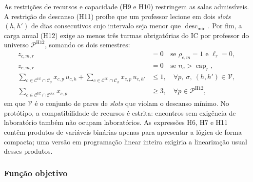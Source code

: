 As restrições de recursos e capacidade (H9 e H10) restringem as salas admissíveis. A restrição de descanso (H11) proíbe que um professor lecione em dois \textit{slots} $(h,h')$ de dias consecutivos cujo intervalo seja menor que $\operatorname{desc}_{\min}$. Por fim, a carga anual (H12) exige ao menos três turmas obrigatórias do IC por professor do universo $\mathcal{P}^{\mathrm{H12}}$, somando os dois semestres:
\begin{align}
  z_{c,m,r} &= 0 \quad \text{se } \rho_{c,m}=1 \text{ e } \ell_r=0, \tag{H9}\\
  z_{c,m,r} &= 0 \quad \text{se } n_c>\operatorname{cap}_r, \tag{H10}\\
  \sum_{c\in\mathcal{C}^{\mathrm{IC}}\cap\mathcal{C}_\sigma} x_{c,p}\,u_{c,h}
  +\sum_{c\in\mathcal{C}^{\mathrm{IC}}\cap\mathcal{C}_\sigma} x_{c,p}\,u_{c,h'} &\leq 1,
  \quad \forall p,\ \sigma,\ (h,h')\in\mathcal{V}, \tag{H11}\\
  \sum_{c\in\mathcal{C}^{\mathrm{IC}}\cap\mathcal{C}^{\mathrm{obr}}} x_{c,p} &\geq 3,
  \quad \forall p\in\mathcal{P}^{\mathrm{H12}}, \tag{H12}
\end{align}
em que $\mathcal{V}$ é o conjunto de pares de \textit{slots} que violam o descanso mínimo. No protótipo, a compatibilidade de recursos é estrita: encontros sem exigência de laboratório também não ocupam laboratórios. As expressões H6, H7 e H11 contêm produtos de variáveis binárias apenas para apresentar a lógica de forma compacta; uma versão em programação linear inteira exigiria a linearização usual desses produtos.


\subsubsection{Função objetivo}


